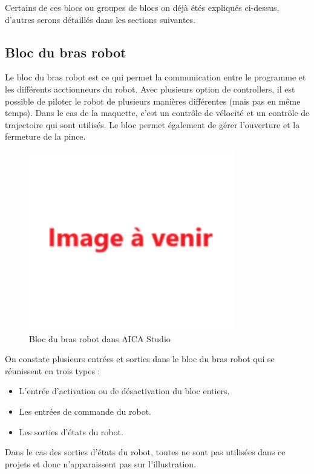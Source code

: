 Certains de ces blocs ou groupes de blocs on déjà étés expliqués ci-dessus, d'autres serons détaillés dans les sections suivantes.

\subsection{Bloc du bras robot}

Le bloc du bras robot est ce qui permet la communication entre le programme et les différents acctionneurs du robot. Avec plusieurs option de controllers, il est possible de piloter le robot de plusieurs manières différentes (mais pas en même temps). Dans le cas de la maquette, c'est un contrôle de vélocité et un contrôle de trajectoire qui sont utilisés. Le bloc permet également de gérer l'ouverture et la fermeture de la pince.

\begin{figure}[H]
    \centering
    \includegraphics[width=0.8\textwidth]{assets/figures/img_a_venir.png}
    \caption{Bloc du bras robot dans AICA Studio}
    \label{fig:robot_block}
\end{figure}

On constate plusieurs entrées et sorties dans le bloc du bras robot qui se réunissent en trois types :
\begin{itemize}
    \item L'entrée d'activation ou de désactivation du bloc entiers.
    \item Les entrées de commande du robot.
    \item Les sorties d'états du robot.
\end{itemize}


Dans le cas des sorties d'états du robot, toutes ne sont pas utilisées dans ce projets et donc n'apparaissent pas sur l'illustration.

